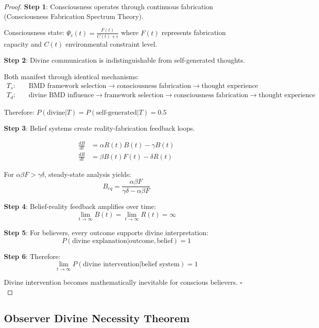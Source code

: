 \documentclass[12pt,a4paper]{article}
\begin{document}
\begin{proof}
\textbf{Step 1}: Consciousness operates through continuous fabrication (Consciousness Fabrication Spectrum Theory).

Consciousness state: $\Psi_c(t) = \frac{F(t)}{C(t) + \epsilon}$ where $F(t)$ represents fabrication capacity and $C(t)$ environmental constraint level.

\textbf{Step 2}: Divine communication is indistinguishable from self-generated thoughts.

Both manifest through identical mechanisms:
\begin{align}
T_s: &\quad \text{BMD framework selection} \rightarrow \text{consciousness fabrication} \rightarrow \text{thought experience}\\
T_d: &\quad \text{divine BMD influence} \rightarrow \text{framework selection} \rightarrow \text{consciousness fabrication} \rightarrow \text{thought experience}
\end{align}

Therefore: $P(\text{divine}|T) = P(\text{self-generated}|T) = 0.5$

\textbf{Step 3}: Belief systems create reality-fabrication feedback loops.

\begin{align}
\frac{dB}{dt} &= \alpha R(t) B(t) - \gamma B(t)\\
\frac{dR}{dt} &= \beta B(t) F(t) - \delta R(t)
\end{align}

For $\alpha \beta F > \gamma \delta$, steady-state analysis yields:
$$B_{eq} = \frac{\alpha \beta F}{\gamma \delta - \alpha \beta F}$$

\textbf{Step 4}: Belief-reality feedback amplifies over time:
$$\lim_{t \to \infty} B(t) = \lim_{t \to \infty} R(t) = \infty$$

\textbf{Step 5}: For believers, every outcome supports divine interpretation:
$$P(\text{divine explanation}|\text{outcome}, \text{belief}) = 1$$

\textbf{Step 6}: Therefore:
$$\lim_{t \to \infty} P(\text{divine intervention}|\text{belief system}) = 1$$

Divine intervention becomes mathematically inevitable for conscious believers. $\square$
\end{proof}

\subsection{Observer Divine Necessity Theorem}
\end{document}
